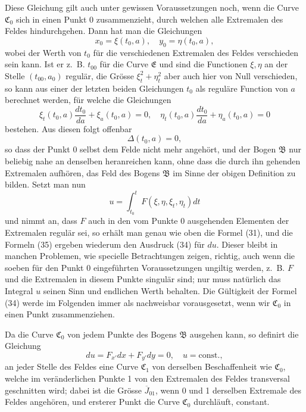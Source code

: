 \documentclass[11pt,a4paper,leqno]{article}
\begin{document}
Diese Gleichung gilt auch unter gewissen Voraussetzungen noch, wenn die Curve $\mathfrak{C}_0$ sich in einen Punkt 0 zusammenzieht, durch welchen alle Extremalen des Feldes hindurchgehen. Dann hat man die Gleichungen
\[
x_0=\xi(t_0,a),\quad y_0=\eta(t_0,a),
\]
wobei der Werth von $t_0$ für die verschiedenen Extremalen des Feldes verschieden sein kann. Ist er z.~B. $t_{00}$ für die Curve $\mathfrak{E}$ und sind die Functionen $\xi,\eta$ an der Stelle $(t_{00},a_0)$ regulär, die Grösse $\xi_t^2+\eta_t^2$ aber auch hier von Null verschieden, so kann aus einer der letzten beiden Gleichungen $t_0$ als reguläre Function von $a$ berechnet werden, für welche die Gleichungen
\begin{equation}\tag{35}
\xi_t(t_0,a)\frac{dt_0}{da}+\xi_a(t_0,a)=0,
\quad
\eta_t(t_0,a)\frac{dt_0}{da}+\eta_a(t_0,a)=0
\end{equation}
bestehen. Aus diesen folgt offenbar
\[
\Delta(t_0,a)=0,
\]
so dass der Punkt 0 selbst dem Felde nicht mehr angehört, und der Bogen $\mathfrak{B}$ nur beliebig nahe an denselben heranreichen kann,
ohne dass die durch ihn gehenden Extremalen aufhören, das Feld des Bogens $\mathfrak{B}$ im Sinne der obigen Definition zu bilden. Setzt man nun
\[
u=\int_{t_0}^{t}F(\xi,\eta,\xi_t,\eta_t)dt
\]
und nimmt an, dass $F$ auch in den vom Punkte 0 ausgehenden Elementen der Extremalen regulär sei, so erhält man genau wie oben die Formel (31), und die Formeln (35) ergeben wiederum den Ausdruck (34) für $du$. Dieser bleibt in manchen Problemen, wie specielle Betrachtungen zeigen, richtig, auch wenn die soeben für den Punkt 0 eingeführten Voraussetzungen ungiltig werden, z.~B. $F$ und die Extremalen in diesem Punkte singulär sind; nur muss natürlich das Integral $u$ seinen Sinn und endlichen Werth behalten. Die Gültigkeit der Formel (34) werde im Folgenden immer als nachweisbar vorausgesetzt, wenn wir $\mathfrak{C}_0$ in einen Punkt zusammenziehen.

Da die Curve $\mathfrak{C}_0$ von jedem Punkte des Bogens $\mathfrak{B}$ ausgehen kann, so definirt die Gleichung
\[
du=F_{x'}dx+F_{y'}dy=0,
\quad u=\text{const.},
\]
an jeder Stelle des Feldes eine Curve $\mathfrak{C}_1$ von derselben Beschaffenheit wie $\mathfrak{C}_0$, welche im veränderlichen Punkte 1 von den Extremalen des Feldes transversal geschnitten wird; dabei ist die Grösse $\overline{J}_{01}$, wenn 0 und 1 derselben Extremale des Feldes angehören, und ersterer Punkt die Curve $\mathfrak{C}_0$ durchläuft, constant.
\end{document}

